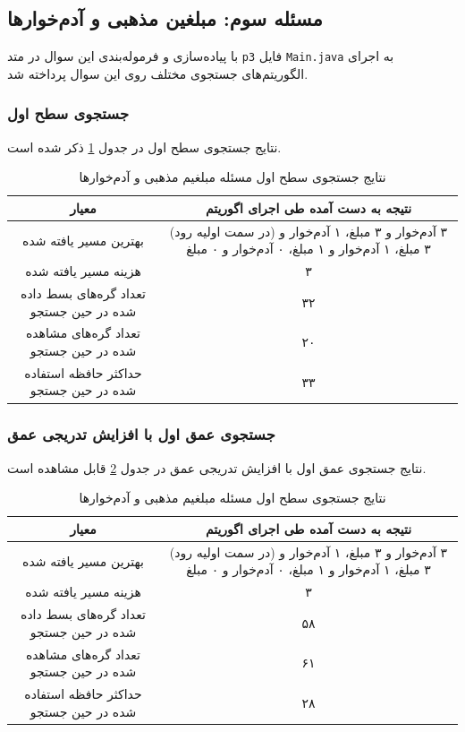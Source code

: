 	\subsection{مسئله سوم: مبلغین مذهبی و آدم‌خوارها}
	با پیاده‌‌سازی و فرموله‌بندی این سوال در متد
	\texttt{p3}
	فایل
	\texttt{Main.java}
	به اجرای الگوریتم‌های جستجوی مختلف روی این سوال پرداخته شد.
	\subsubsection{جستجوی سطح اول}
	نتایج جستجوی سطح اول در جدول
	\ref{p3-bfs}
	ذکر شده است.
			\begin{table}[H]
			\centering
			\caption{نتایج جستجوی سطح اول مسئله مبلغیم مذهبی و آدم‌خوارها}
			\label{p3-bfs}
			\begin{tabular}{c|c}
				معیار                                   & نتیجه به دست آمده طی اجرای اگوریتم \\ \hline
				بهترین مسیر یافته شده & (در سمت اولیه رود) ۳ آدم‌خوار و ۳ مبلغ، ۱ آدم‌خوار و ۳ مبلغ، ۱ آدم‌خوار و ۱ مبلغ، ۰ آدم‌خوار و ۰ مبلغ\\
				هزینه مسیر یافته شده   & ۳ \\
				تعداد گره‌های بسط داده شده در حین جستجو & ۳۲ \\
				تعداد گره‌های مشاهده شده در حین جستجو   & ۲۰ \\
				حداکثر حافظه استفاده شده در حین جستجو   & ۳۳                                 
			\end{tabular}
		\end{table}	 
	\subsubsection{جستجوی عمق اول با افزایش تدریجی عمق}
	نتایج جستجوی عمق اول با افزایش تدریجی عمق در جدول
	\ref{p3-dfs}
	قابل مشاهده است.
	\begin{table}[H]
		\centering
		\caption{نتایج جستجوی سطح اول مسئله مبلغیم مذهبی و آدم‌خوارها}
		\label{p3-dfs}
		\begin{tabular}{c|c}
			معیار                                   & نتیجه به دست آمده طی اجرای اگوریتم \\ \hline
			بهترین مسیر یافته شده & (در سمت اولیه رود) ۳ آدم‌خوار و ۳ مبلغ، ۱ آدم‌خوار و ۳ مبلغ، ۱ آدم‌خوار و ۱ مبلغ، ۰ آدم‌خوار و ۰ مبلغ\\
			هزینه مسیر یافته شده   & ۳ \\
			تعداد گره‌های بسط داده شده در حین جستجو & ۵۸ \\
			تعداد گره‌های مشاهده شده در حین جستجو   & ۶۱ \\
			حداکثر حافظه استفاده شده در حین جستجو   & ۲۸                                 
		\end{tabular}
	\end{table}	 
	
	
